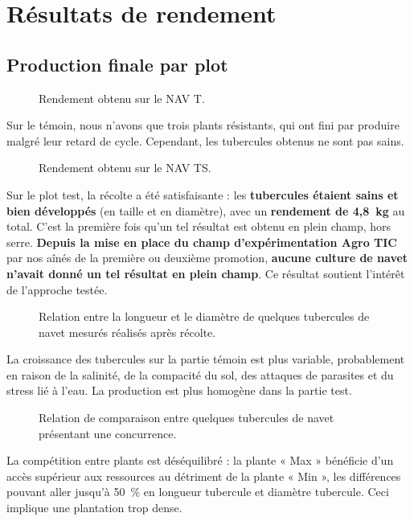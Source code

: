\section{Résultats de rendement}
\subsection{Production finale par plot}
\begin{figure}[H]
    \centering
    \caption{Rendement obtenu sur le NAV T. }
    \label{fig:rendement-navT}
\end{figure}
Sur le témoin, nous n’avons que trois plants résistants, qui ont fini par produire malgré leur retard de cycle. Cependant, les tubercules obtenus ne sont pas sains.

\begin{figure}[H]
    \centering
    \caption{Rendement obtenu sur le NAV TS. }
    \label{fig:rendement-navTS}
\end{figure} 
Sur le plot test, la récolte a été satisfaisante : les \textbf{tubercules étaient  sains et bien développés} (en taille et en diamètre), avec un \textbf{rendement de 4{,}8~kg} au total. C’est la première fois qu’un tel résultat est obtenu en plein champ, hors serre. \textbf{Depuis la mise en place du champ d'expérimentation Agro TIC} par nos aînés de la première ou deuxième promotion, \textbf{aucune culture de navet n’avait donné un tel résultat en plein champ}. Ce résultat soutient l’intérêt de l’approche testée.

\begin{figure}[H]
    \centering
    \caption{Relation entre la longueur et le diamètre de quelques tubercules de navet mesurés réalisés après récolte. }
    \label{fig:long-Diam-navet}
\end{figure} 
La croissance des tubercules sur la partie témoin est plus variable, probablement en raison de la salinité, de la compacité du sol, des attaques de parasites et du stress lié à l'eau. La production est plus homogène dans la partie test.

\begin{figure}[H]
    \centering
    \caption{Relation de comparaison entre quelques tubercules de navet présentant une concurrence. }
    \label{fig:navet-concurence}
\end{figure} 
La compétition entre plants est déséquilibré : la plante « Max » bénéficie d’un accès supérieur 
aux ressources au détriment de la plante « Min », les différences pouvant aller jusqu'à 50~\% en longueur tubercule et diamètre tubercule. Ceci implique une plantation trop dense.

